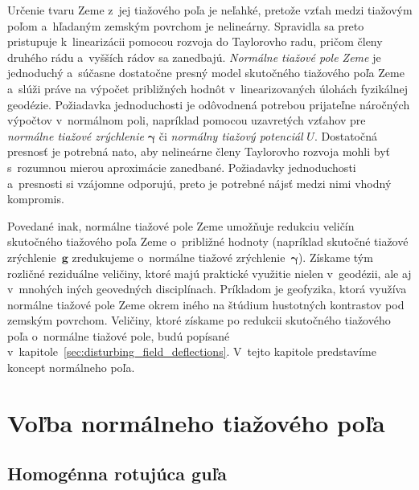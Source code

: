 \documentclass[a4paper, 12pt]{book}
\let\vec\mathbf
\begin{document}
Určenie tvaru Zeme z~jej tiažového poľa je neľahké, pretože vzťah medzi 
tiažovým poľom a~hľadaným zemským povrchom je nelineárny.  Spravidla sa preto 
pristupuje k~linearizácii pomocou rozvoja do Taylorovho radu, pričom členy 
druhého rádu a~vyšších rádov sa zanedbajú.  \emph{Normálne tiažové pole Zeme} 
je jednoduchý a~súčasne dostatočne presný model skutočného tiažového poľa Zeme 
a~slúži práve na výpočet približných hodnôt v~linearizovaných úlohách 
fyzikálnej geodézie.  Požiadavka jednoduchosti je odôvodnená potrebou 
prijateľne náročných výpočtov v~normálnom poli, napríklad pomocou uzavretých 
vzťahov pre \emph{normálne tiažové zrýchlenie} $\boldsymbol{\gamma}$ či 
\emph{normálny tiažový potenciál} $U$.  Dostatočná presnosť je potrebná nato, 
aby nelineárne členy Taylorovho rozvoja mohli byť s~rozumnou mierou aproximácie 
zanedbané.  Požiadavky jednoduchosti a~presnosti si vzájomne odporujú, preto je 
potrebné nájsť medzi nimi vhodný kompromis.

Povedané inak, normálne tiažové pole Zeme umožňuje redukciu veličín skutočného 
tiažového poľa Zeme o~približné hodnoty (napríklad skutočné tiažové 
zrýchlenie~$\vec g$ zredukujeme o~normálne tiažové 
zrýchlenie~$\boldsymbol{\gamma}$).  Získame tým rozličné reziduálne veličiny, 
ktoré majú praktické využitie nielen v~geodézii, ale aj v~mnohých iných 
geovedných disciplínach.  Príkladom je geofyzika, ktorá využíva normálne 
tiažové pole Zeme okrem iného na štúdium hustotných kontrastov pod zemským 
povrchom.  Veličiny, ktoré získame po redukcii skutočného tiažového poľa 
o~normálne tiažové pole, budú popísané 
v~kapitole~\ref{sec:disturbing_field_deflections}.  V~tejto kapitole 
predstavíme koncept normálneho poľa.

\section{Voľba normálneho tiažového poľa}
\label{sec:choice_of_normal_gravity_field}

\subsection{Homogénna rotujúca guľa}
\label{sec:normal_field_ball}
\end{document}

